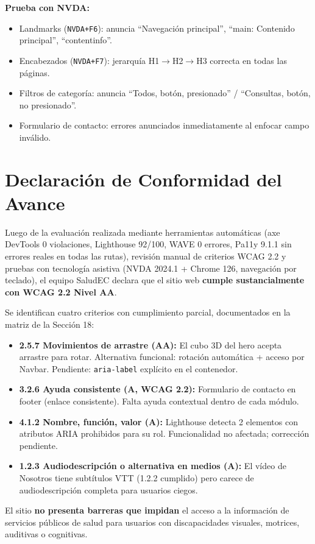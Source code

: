 \documentclass[12pt, a4paper]{article}
\begin{document}
\textbf{Prueba con NVDA:}
\begin{itemize}
  \item Landmarks (\texttt{NVDA+F6}): anuncia ``Navegación principal'', ``main: Contenido principal'', ``contentinfo''.
  \item Encabezados (\texttt{NVDA+F7}): jerarquía H1$\to$H2$\to$H3 correcta en todas las páginas.
  \item Filtros de categoría: anuncia ``Todos, botón, presionado'' / ``Consultas, botón, no presionado''.
  \item Formulario de contacto: errores anunciados inmediatamente al enfocar campo inválido.
\end{itemize}

\section{Declaración de Conformidad del Avance}

\begin{wcagbox}
Luego de la evaluación realizada mediante herramientas automáticas (axe DevTools 0 violaciones, Lighthouse 92/100, WAVE 0 errores, Pa11y 9.1.1 sin errores reales en todas las rutas), revisión manual de criterios WCAG 2.2 y pruebas con tecnología asistiva (NVDA 2024.1 + Chrome 126, navegación por teclado), el equipo SaludEC declara que el sitio web \textbf{cumple sustancialmente con WCAG 2.2 Nivel AA}.

Se identifican cuatro criterios con cumplimiento parcial, documentados en la matriz de la Sección 18:
\begin{itemize}
  \item \textbf{2.5.7 Movimientos de arrastre (AA):} El cubo 3D del hero acepta arrastre para rotar. Alternativa funcional: rotación automática + acceso por Navbar. Pendiente: \texttt{aria-label} explícito en el contenedor.
  \item \textbf{3.2.6 Ayuda consistente (A, WCAG 2.2):} Formulario de contacto en footer (enlace consistente). Falta ayuda contextual dentro de cada módulo.
  \item \textbf{4.1.2 Nombre, función, valor (A):} Lighthouse detecta 2 elementos con atributos ARIA prohibidos para su rol. Funcionalidad no afectada; corrección pendiente.
  \item \textbf{1.2.3 Audiodescripción o alternativa en medios (A):} El vídeo de Nosotros tiene subtítulos VTT (1.2.2 cumplido) pero carece de audiodescripción completa para usuarios ciegos.
\end{itemize}

El sitio \textbf{no presenta barreras que impidan} el acceso a la información de servicios públicos de salud para usuarios con discapacidades visuales, motrices, auditivas o cognitivas.
\end{wcagbox}
\end{document}
